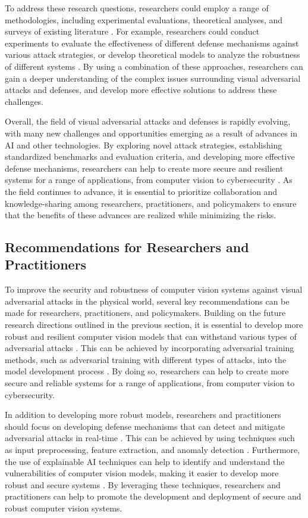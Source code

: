 \documentclass[11pt]{article}
\begin{document}
To address these research questions, researchers could employ a range of methodologies, including experimental evaluations, theoretical analyses, and surveys of existing literature \cite{ref228}. For example, researchers could conduct experiments to evaluate the effectiveness of different defense mechanisms against various attack strategies, or develop theoretical models to analyze the robustness of different systems \cite{ref229}. By using a combination of these approaches, researchers can gain a deeper understanding of the complex issues surrounding visual adversarial attacks and defenses, and develop more effective solutions to address these challenges.

Overall, the field of visual adversarial attacks and defenses is rapidly evolving, with many new challenges and opportunities emerging as a result of advances in AI and other technologies. By exploring novel attack strategies, establishing standardized benchmarks and evaluation criteria, and developing more effective defense mechanisms, researchers can help to create more secure and resilient systems for a range of applications, from computer vision to cybersecurity \cite{ref230}. As the field continues to advance, it is essential to prioritize collaboration and knowledge-sharing among researchers, practitioners, and policymakers to ensure that the benefits of these advances are realized while minimizing the risks.

\subsection{Recommendations for Researchers and Practitioners}

To improve the security and robustness of computer vision systems against visual adversarial attacks in the physical world, several key recommendations can be made for researchers, practitioners, and policymakers. Building on the future research directions outlined in the previous section, it is essential to develop more robust and resilient computer vision models that can withstand various types of adversarial attacks \cite{ref7}. This can be achieved by incorporating adversarial training methods, such as adversarial training with different types of attacks, into the model development process \cite{ref231}. By doing so, researchers can help to create more secure and reliable systems for a range of applications, from computer vision to cybersecurity.

In addition to developing more robust models, researchers and practitioners should focus on developing defense mechanisms that can detect and mitigate adversarial attacks in real-time \cite{ref232}. This can be achieved by using techniques such as input preprocessing, feature extraction, and anomaly detection \cite{ref233}. Furthermore, the use of explainable AI techniques can help to identify and understand the vulnerabilities of computer vision models, making it easier to develop more robust and secure systems \cite{ref234}. By leveraging these techniques, researchers and practitioners can help to promote the development and deployment of secure and robust computer vision systems.
\end{document}

